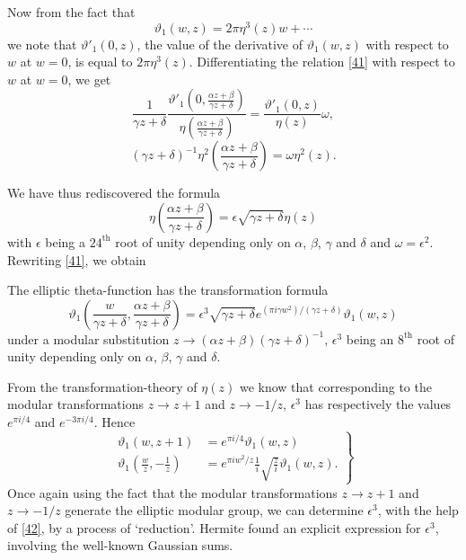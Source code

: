 Now from the fact that
$$
\vartheta_{1}(w,z)=2\pi \eta^{3}(z)w+\cdots
$$
we note that $\vartheta'_{1}(0,z)$, the value of the derivative of
$\vartheta_{1}(w,z)$ with respect to $w$ at $w=0$, is equal to $2\pi
\eta^{3}(z)$. Differentiating the relation \eqref{41} with respect to
$w$ at $w=0$, we get
$$
\frac{1}{\gamma z+\delta}\frac{\vartheta'_{1}\left(0,\frac{\alpha
    z+\beta}{\gamma z+\delta}\right)}{\eta\left(\frac{\alpha
    z+\beta}{\gamma
    z+\delta}\right)}=\frac{\vartheta'_{1}(0,z)}{\eta(z)}\omega, 
$$
\ie
$$
(\gamma z+\delta)^{-1}\eta^{2}\left(\frac{\alpha z+\beta}{\gamma
  z+\delta}\right)=\omega\eta^{2}(z). 
$$

We have thus rediscovered the formula
$$
\eta\left(\frac{\alpha z+\beta}{\gamma
  z+\delta}\right)=\epsilon\sqrt{\gamma z+\delta}\eta(z)
$$
with $\epsilon$ being a $24^{\text{th}}$ root of unity depending only
on $\alpha$, $\beta$, $\gamma$ and $\delta$ and
$\omega=\epsilon^{2}$. Rewriting \eqref{41}, we obtain

\begin{proposition}\label{prop4}
The elliptic theta-function has the transformation formula
$$
\vartheta_{1}\left(\frac{w}{\gamma z+\delta},\frac{\alpha
  z+\beta}{\gamma z+\delta}\right)=\epsilon^{3}\sqrt{\gamma
  z+\delta}e^{(\pi i\gamma w^{2})/(\gamma z+\delta)}\vartheta_{1}(w,z) 
$$
under a modular substitution $z\to(\alpha z+\beta)(\gamma
z+\delta)^{-1}$, $\epsilon^{3}$ being an $8^{\text{th}}$ root of unity
depending only on $\alpha$, $\beta$, $\gamma$ and $\delta$.
\end{proposition}

From the transformation-theory of $\eta(z)$ we know that corresponding
to the modular transformations $z\to z+1$ and $z\to -1/z$,
$\epsilon^{3}$ has respectively the values $e^{\pi i/4}$ and $e^{-3\pi
  i/4}$. Hence 
\begin{equation*}
\left.
\begin{aligned}
\vartheta_{1}(w,z+1) &= e^{\pi i/4}\vartheta_{1}(w,z)\\
\vartheta_{1}\left(\frac{w}{z},-\frac{1}{z}\right) &= e^{\pi
  iw^{2}/z}\frac{1}{i}\sqrt{\frac{z}{i}}\vartheta_{1}(w,z). 
\end{aligned}\right\}
\tag{42}\label{42}
\end{equation*}\pageoriginale
Once again using the fact that the modular transformations $z\to z+1$
and $z\to -1/z$ generate the elliptic modular group, we can determine
$\epsilon^{3}$, with the help of \eqref{42}, by a process of
`reduction'. Hermite found an explicit expression for $\epsilon^{3}$,
involving the well-known Gaussian sums.


